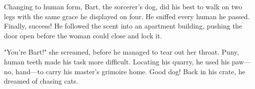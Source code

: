 Changing to human form, Bart, the sorcerer's dog, did his best to walk
on two legs with the same grace he displayed on four. He sniffed every
human he passed. Finally, success! He followed the scent into an
apartment building, pushing the door open before the woman could close
and lock it.

"You're Bart!" she screamed, before he managed to tear out her throat.
Puny, human teeth made his task more difficult. Locating his quarry, he
used his paw---no, hand---to carry his master's grimoire home. Good dog!
Back in his crate, he dreamed of chasing cats.
